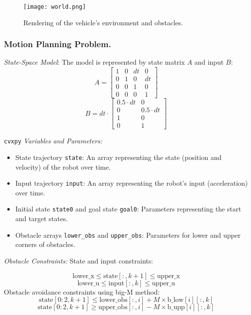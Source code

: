 \documentclass[
	letterpaper, %
	10pt, %
	unnumberedsections, %
	twoside, %
]{LTJournalArticle}
\begin{document}
\begin{figure} %
	\texttt{[image: world.png]}
	\caption{Rendering of the vehicle's environment and obstacles.}
\end{figure}

\subsubsection{Motion Planning Problem.} \textit{State-Space Model}: The model is represented by state matrix \( A \) and input \( B \):
\[
A = \begin{bmatrix}
1 & 0 & dt & 0 \\
0 & 1 & 0 & dt \\
0 & 0 & 1 & 0 \\
0 & 0 & 0 & 1
\end{bmatrix}
\]
\[
B = dt \cdot \begin{bmatrix}
0.5 \cdot dt & 0 \\
0 & 0.5 \cdot dt \\
1 & 0 \\
0 & 1
\end{bmatrix}
\]

\noindent \texttt{cvxpy} \textit{Variables and Parameters:}
\begin{itemize}
  \item State trajectory \texttt{state}: An array representing the state (position and velocity) of the robot over time.
  \item Input trajectory \texttt{input}: An array representing the robot's input (acceleration) over time.
  \item Initial state \texttt{state0} and goal state \texttt{goal0}: Parameters representing the start and target states.
  \item Obstacle arrays \texttt{lower\_obs} and \texttt{upper\_obs}: Parameters for lower and upper corners of obstacles.
\end{itemize}

\noindent \textit{Obstacle Constraints:} State and input constraints:

\[
\text{lower\_x} \leq \text{state}[:, k + 1] \leq \text{upper\_x}
\]
\[
\text{lower\_u} \leq \text{input}[:, k] \leq \text{upper\_u}
\]
Obstacle avoidance constraints using big-M method:
\[
\text{state}[0:2, k + 1] \leq \text{lower\_obs}[:, i] + M \times \text{b\_low}[i][:, k]
\]
\[
\text{state}[0:2, k + 1] \geq \text{upper\_obs}[:, i] - M \times \text{b\_upp}[i][:, k]
\]
\end{document}
